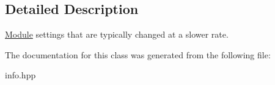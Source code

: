 \subsection{Detailed Description}
\hyperlink{classhebi_1_1Module}{Module} settings that are typically changed at a slower rate. 

The documentation for this class was generated from the following file\+:\begin{DoxyCompactItemize}
\item 
info.\+hpp\end{DoxyCompactItemize}
